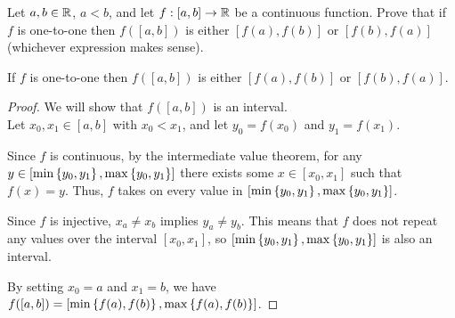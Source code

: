 \begin{problem}
  Let $a, b \in \mathbb{R}$, $a < b$, and let $f : [a, b] \to \mathbb{R}$ be a continuous function.
  Prove that if $f$ is one-to-one then $f([a, b])$ is either
  $[f(a), f(b)]$ or $[f(b), f(a)]$ (whichever expression makes sense).
\end{problem}
\begin{answer}
  \begin{claim}
    If $f$ is one-to-one then $f([a, b])$ is either
    $[f(a), f(b)]$ or $[f(b), f(a)]$.
    \begin{proof}
      We will show that $f([a, b])$ is an interval. \\
      Let $x_0, x_1 \in [a, b]$ with $x_0 < x_1$,
      and let $y_0 = f(x_0)$ and $y_1 = f(x_1)$.
      \begin{enumarabic}
        \item Since $f$ is continuous, by the intermediate value theorem,
          for any $y \in [\min\left\{y_0, y_1\right\}, \max\left\{y_0, y_1\right\}]$
          there exists some $x \in [x_0, x_1]$ such that $f(x) = y$.
          Thus, $f$ takes on every value in $[\min\left\{y_0, y_1\right\}, \max\left\{y_0, y_1\right\}]$.
        \item Since $f$ is injective, $x_a \neq x_b$ implies $y_a \neq y_b$.
          This means that $f$ does not repeat any values over the interval
          $[x_0, x_1]$, so $[\min\left\{y_0, y_1\right\}, \max\left\{y_0, y_1\right\}]$
          is also an interval.
      \end{enumarabic}
      By setting $x_0 = a$ and $x_1 = b$,
      we have $f([a, b]) = [\min\left\{f(a), f(b)\right\}, \max\left\{f(a), f(b)\right\}]$.
    \end{proof}
  \end{claim}
\end{answer}
